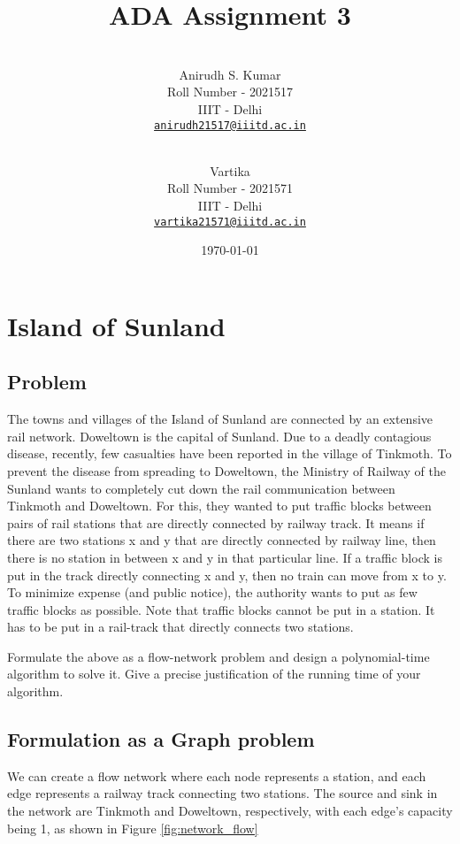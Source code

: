 \documentclass[12pt]{article}
\title{ADA Assignment 3}
\author{
    \\\vspace{0em} Anirudh S. Kumar \\\vspace{-0.5em}
    \footnotesize{Roll Number - 2021517}\\\vspace{-0.5em}
    \footnotesize{IIIT - Delhi}\\\vspace{-0.5em}
    \footnotesize{\href{mailto:anirudh21517@iiitd.ac.in}{\texttt{anirudh21517@iiitd.ac.in}}}
  \and
    \\\vspace{0em} Vartika\\\vspace{-0.5em}
    \footnotesize{Roll Number - 2021571}\\\vspace{-0.5em}
    \footnotesize{IIIT - Delhi}\\\vspace{-0.5em}
    \footnotesize{\href{mailto:vartika21571@iiitd.ac.in}{\texttt{vartika21571@iiitd.ac.in}}} 
    \vspace{1em}
}
\date{\today}
\newenvironment{statement}{\color[rgb]{1.00,0.00,0.50} {}}{}
\begin{document}
\maketitle

\pagestyle{fancy}
\fancyhf{}
\fancyfoot[C]{\thepage}

\section{Island of Sunland}
\subsection{Problem}

\begin{statement}
    The towns and villages of the Island of Sunland are connected by an extensive rail
network. Doweltown is the capital of Sunland. Due to a deadly contagious disease, recently, few
casualties have been reported in the village of Tinkmoth. To prevent the disease from spreading
to Doweltown, the Ministry of Railway of the Sunland wants to completely cut down the rail
communication between Tinkmoth and Doweltown. For this, they wanted to put traffic blocks
between pairs of rail stations that are directly connected by railway track. It means if there are two
stations x and y that are directly connected by railway line, then there is no station in between x
and y in that particular line. If a traffic block is put in the track directly connecting x and y, then
no train can move from x to y. To minimize expense (and public notice), the authority wants to
put as few traffic blocks as possible. Note that traffic blocks cannot be put in a station. It has to
be put in a rail-track that directly connects two stations.

Formulate the above as a flow-network problem and design a polynomial-time algorithm to solve
it. Give a precise justification of the running time of your algorithm.
\end{statement}

\subsection{Formulation as a Graph problem}
We can create a flow network where each node represents a station, and each edge represents a railway track connecting two stations. The source and sink in the network are Tinkmoth and Doweltown, respectively, with each edge's capacity being 1, as shown in Figure \ref{fig:network_flow}
\end{document}
